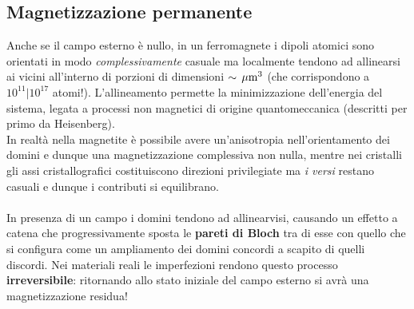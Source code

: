 \subsection{Magnetizzazione permanente}
Anche se il campo esterno è nullo, in un ferromagnete i dipoli atomici sono orientati in modo \textit{complessivamente} casuale ma localmente tendono ad allinearsi ai vicini all'interno di porzioni di dimensioni $\sim \, \mathrm{\mu m^{3}}$ (che corrispondono a $10^{11} | 10^{17}$ atomi!). L'allineamento permette la minimizzazione dell'energia del sistema, legata a processi non magnetici di origine quantomeccanica (descritti per primo da Heisenberg).
\\In realtà nella magnetite è possibile avere un'anisotropia nell'orientamento dei domini e dunque una magnetizzazione complessiva non nulla, mentre nei cristalli gli assi cristallografici costituiscono direzioni privilegiate ma \textit{i versi} restano casuali e dunque i contributi si equilibrano.
\\~\\
In presenza di un campo i domini tendono ad allinearvisi, causando un effetto a catena che progressivamente sposta le \textbf{pareti di Bloch} tra di esse con quello che si configura come un ampliamento dei domini concordi a scapito di quelli discordi. Nei materiali reali le imperfezioni rendono questo processo \textbf{irreversibile}: ritornando allo stato iniziale del campo esterno si avrà una magnetizzazione residua!

